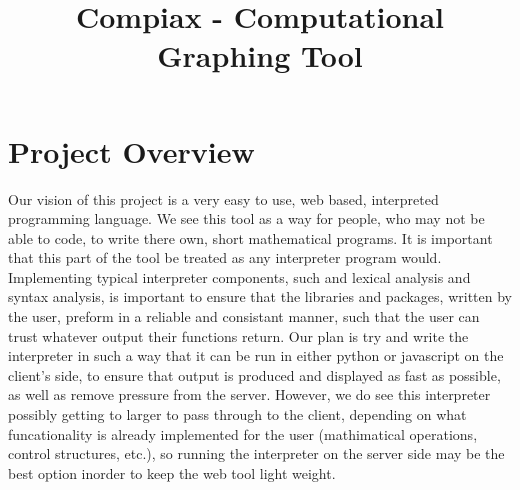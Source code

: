 \documentclass{article}
\title{Compiax - Computational Graphing Tool}
\begin{document}
    \newcommand{\titleimage}{compiax.png}
    
    
    
	

	\newpage

	\section{Project Overview}

	Our vision of this project is a very easy to use, web based, interpreted programming language. We see this tool as a way for people, 
    who may not be able to code, to write there own, short mathematical programs. It is important that this part of the tool be treated as
    any interpreter program would. Implementing typical interpreter components, such and lexical analysis and syntax analysis, is important
    to ensure that the libraries and packages, written by the user, preform in a reliable and consistant manner, such that the user can 
    trust whatever output their functions return. Our plan is try and write the interpreter in such a way that it can be run in either python
    or javascript on the client's side, to ensure that output is produced and displayed as fast as possible, as well as remove pressure 
    from the server. However, we do see this interpreter possibly getting to larger to pass through to the client, depending on what 
    funcationality is already implemented for the user (mathimatical operations, control structures, etc.), so running the interpreter on the
    server side may be the best option inorder to keep the web tool light weight. \par
\end{document}
